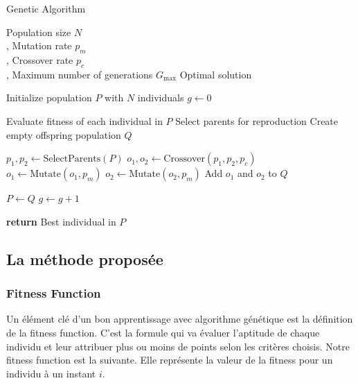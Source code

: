 \documentclass[journal, a4paper]{IEEEtran}
\begin{document}
		\begin{algorithm}
		  \caption{Genetic Algorithm}\label{alg:ga}
		  \begin{algorithmic}
			\Require Population size $N$
			\\ , Mutation rate $p_m$
			\\ , Crossover rate $p_c$
			\\ , Maximum number of generations $G_{\max}$
			\Ensure Optimal solution

			\State Initialize population $P$ with $N$ individuals
			\State $g \gets 0$

			  \State Evaluate fitness of each individual in $P$
			  \State Select parents for reproduction
			  \State Create empty offspring population $Q$

				\State $p_1, p_2 \gets \text{SelectParents}(P)$
				\State $o_1, o_2 \gets \text{Crossover}(p_1, p_2, p_c)$
				\State $o_1 \gets \text{Mutate}(o_1, p_m)$
				\State $o_2 \gets \text{Mutate}(o_2, p_m)$
				\State Add $o_1$ and $o_2$ to $Q$
			  \EndWhile

			  \State $P \gets Q$
			  \State $g \gets g + 1$
			\EndWhile

			\State \textbf{return} Best individual in $P$
		  \end{algorithmic}
	\end{algorithm}


	\subsection{La méthode proposée}
	\subsubsection{Fitness Function}

		Un élément clé d'un bon apprentissage avec algorithme génétique est la définition de la fitness function. C'est la formule qui va évaluer l'aptitude de chaque individu et leur attribuer plus ou moins de points selon les critères choisis.
		Notre fitness function est la suivante. Elle représente la valeur de la fitness pour un individu à un instant $i$.
\end{document}
